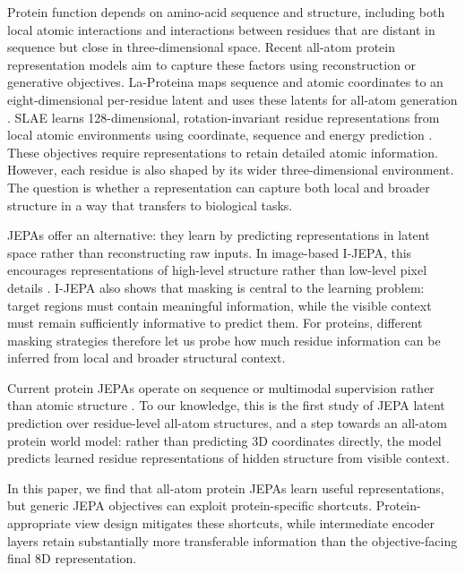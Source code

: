 \documentclass{article}
\begin{document}
Protein function depends on amino-acid sequence and structure, including both local atomic interactions and interactions between residues that are distant in sequence but close in three-dimensional space. Recent all-atom protein representation models aim to capture these factors using reconstruction or generative objectives. La-Proteina maps sequence and atomic coordinates to an eight-dimensional per-residue latent and uses these latents for all-atom generation \citep{la-proteina}. SLAE learns 128-dimensional, rotation-invariant residue representations from local atomic environments using coordinate, sequence and energy prediction \citep{chen2026slae}. These objectives require representations to retain detailed atomic information. However, each residue is also shaped by its wider three-dimensional environment. The question is whether a representation can capture both local and broader structure in a way that transfers to biological tasks.

JEPAs offer an alternative: they learn by predicting representations in latent space rather than reconstructing raw inputs. In image-based I-JEPA, this encourages representations of high-level structure rather than low-level pixel details \citep{assran2023ijepa}. I-JEPA also shows that masking is central to the learning problem: target regions must contain meaningful information, while the visible context must remain sufficiently informative to predict them. For proteins, different masking strategies therefore let us probe how much residue information can be inferred from local and broader structural context.

Current protein JEPAs operate on sequence or multimodal supervision rather than atomic structure \citep{ofer2026proteinjepa,ravideshik2026protjepa}. To our knowledge, this is the first study of JEPA latent prediction over residue-level all-atom structures, and a step towards an all-atom protein world model: rather than predicting 3D coordinates directly, the model predicts learned residue representations of hidden structure from visible context.

In this paper, we find that all-atom protein JEPAs learn useful representations, but generic JEPA objectives can exploit protein-specific shortcuts. Protein-appropriate view design mitigates these shortcuts, while intermediate encoder layers retain substantially more transferable information than the objective-facing final 8D representation.
\end{document}
